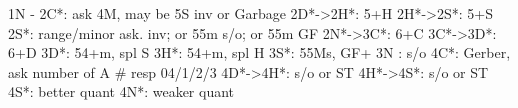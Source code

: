 1N -
2C*: ask 4M, may be 5S inv or Garbage
2D*->2H*: 5+H
2H*->2S*: 5+S
2S*: range/minor ask. inv; or 55m s/o; or 55m GF
2N*->3C*: 6+C
3C*->3D*: 6+D
3D*: 54+m, spl S
3H*: 54+m, spl H
3S*: 55Ms, GF+
3N : s/o
4C*: Gerber, ask number of A  # resp 04/1/2/3
4D*->4H*: s/o or ST
4H*->4S*: s/o or ST
4S*: better quant
4N*: weaker quant